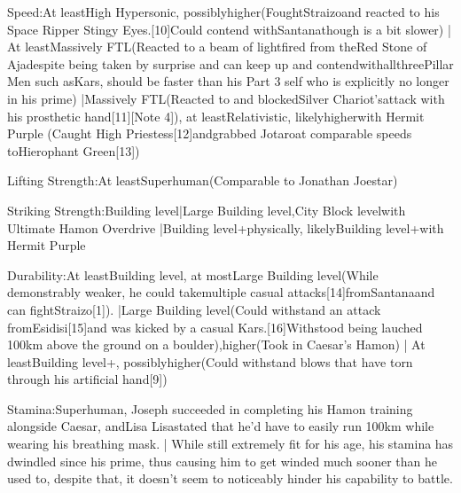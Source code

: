 \documentclass[a4paper,12pt]{article}
\begin{document}
Speed:At leastHigh Hypersonic, possiblyhigher(FoughtStraizoand reacted to his Space Ripper Stingy Eyes.[10]Could contend withSantanathough is a bit slower) | At leastMassively FTL(Reacted to a beam of lightfired from theRed Stone of Ajadespite being taken by surprise and can keep up and contendwithallthreePillar Men such asKars, should be faster than his Part 3 self who is explicitly no longer in his prime) |Massively FTL(Reacted to and blockedSilver Chariot'sattack with his prosthetic hand[11][Note 4]), at leastRelativistic, likelyhigherwith Hermit Purple (Caught High Priestess[12]andgrabbed Jotaroat comparable speeds toHierophant Green[13])\\ \par \vspace{0.5cm}

Lifting Strength:At leastSuperhuman(Comparable to Jonathan Joestar)\\ \par \vspace{0.5cm}

Striking Strength:Building level|Large Building level,City Block levelwith Ultimate Hamon Overdrive |Building level+physically, likelyBuilding level+with Hermit Purple\\ \par \vspace{0.5cm}

Durability:At leastBuilding level, at mostLarge Building level(While demonstrably weaker, he could takemultiple casual attacks[14]fromSantanaand can fightStraizo[1]). |Large Building level(Could withstand an attack fromEsidisi[15]and was kicked by a casual Kars.[16]Withstood being lauched 100km above the ground on a boulder),higher(Took in Caesar's Hamon) | At leastBuilding level+, possiblyhigher(Could withstand blows that have torn through his artificial hand[9])\\ \par \vspace{0.5cm}

Stamina:Superhuman, Joseph succeeded in completing his Hamon training alongside Caesar, andLisa Lisastated that he'd have to easily run 100km while wearing his breathing mask. | While still extremely fit for his age, his stamina has dwindled since his prime, thus causing him to get winded much sooner than he used to, despite that, it doesn't seem to noticeably hinder his capability to battle.\\ \par \vspace{0.5cm}
\end{document}
